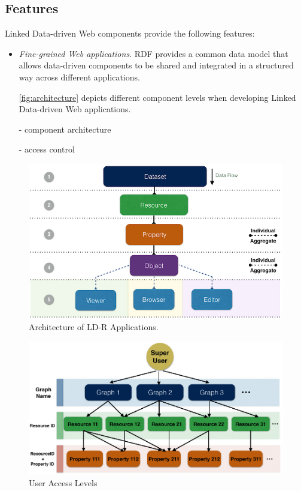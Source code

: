 \documentclass{acm_proc_article-sp}
\begin{document}
\subsection{Features}

Linked Data-driven Web components provide the following features:

\begin{itemize}

\item \emph{Fine-grained Web applications}.
RDF provides a common data model that allows data-driven components to be shared and integrated in a structured way across different applications.

\autoref{fig:architecture} depicts different component levels when developing Linked Data-driven Web applications.

- component architecture

- access control

\end{itemize}


\begin{figure}[tb]
  \includegraphics[width=.9\linewidth]{images/architecture.jpg}
  \caption{Architecture of LD-R Applications.}
  \label{fig:architecture}
\end{figure}



\begin{figure}[tb]
  \includegraphics[width=.9\linewidth]{images/userAccessLevels.jpg}
  \caption{User Access Levels}
\end{figure}
\end{document}
